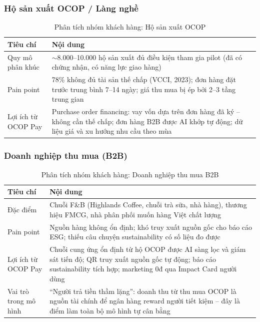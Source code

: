 \documentclass[13pt,a4paper]{extarticle}
\begin{document}
\subsubsection{Hộ sản xuất OCOP / Làng nghề}

\begin{table}[H]
\centering
\caption{Phân tích nhóm khách hàng: Hộ sản xuất OCOP}
\begin{tabular}{|p{4cm}|p{10cm}|}
\hline
\textbf{Tiêu chí} & \textbf{Nội dung} \\
\hline
Quy mô phân khúc & $\sim$8.000--10.000 hộ sản xuất đủ điều kiện tham gia pilot (đã có chứng nhận, có năng lực giao hàng) \\
\hline
Pain point & 78\% không đủ tài sản thế chấp (VCCI, 2023); đơn hàng đặt trước trung bình 7--14 ngày; giá thu mua bị ép bởi 2--3 tầng trung gian \\
\hline
Lợi ích từ OCOP Pay & Purchase order financing: vay vốn dựa trên đơn hàng đã ký -- không cần thế chấp; đơn hàng B2B được AI khớp tự động; dữ liệu giá và xu hướng nhu cầu theo mùa \\
\hline
\end{tabular}
\end{table}

\subsubsection{Doanh nghiệp thu mua (B2B)}

\begin{table}[H]
\centering
\caption{Phân tích nhóm khách hàng: Doanh nghiệp thu mua B2B}
\begin{tabular}{|p{4cm}|p{10cm}|}
\hline
\textbf{Tiêu chí} & \textbf{Nội dung} \\
\hline
Đặc điểm & Chuỗi F\&B (Highlands Coffee, chuỗi trà sữa, nhà hàng), thương hiệu FMCG, nhà phân phối muốn hàng Việt chất lượng \\
\hline
Pain point & Nguồn hàng không ổn định; khó truy xuất nguồn gốc cho báo cáo ESG; thiếu câu chuyện sustainability có số liệu đo được \\
\hline
Lợi ích từ OCOP Pay & Chuỗi cung ứng ổn định từ hộ OCOP được AI sàng lọc và giám sát tiến độ; QR truy xuất nguồn gốc tự động; báo cáo sustainability tích hợp; marketing 0đ qua Impact Card người dùng \\
\hline
Vai trò trong mô hình & ``Người trả tiền thầm lặng'': doanh thu từ thu mua OCOP là nguồn tài chính để ngân hàng reward người tiết kiệm -- đây là điểm làm toàn bộ mô hình tự cân bằng \\
\hline
\end{tabular}
\end{table}
\end{document}
